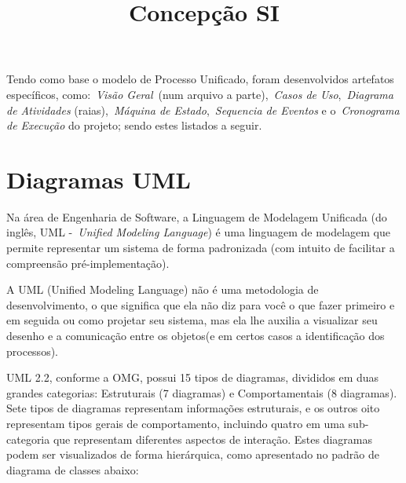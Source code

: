 \documentclass [12pt]{article}
\title {Concepção SI}
\begin{document}
	\inserirTitulo

	Tendo como base o modelo de Processo Unificado, foram desenvolvidos artefatos específicos, como:~\emph{Visão	Geral}~(num arquivo a parte),~\emph{Casos	de	Uso},~\emph{Diagrama	de	Atividades}	(raias),~\emph{Máquina	de	Estado},~\emph{Sequencia	de	Eventos} e	o~\emph{Cronograma	de	Execução}	do	projeto; sendo estes listados a seguir.
	
	\section{Diagramas UML}
	Na área de Engenharia de Software, a Linguagem de Modelagem Unificada (do inglês, UML -~\emph{Unified Modeling Language}) é uma linguagem de modelagem que permite representar um sistema de forma padronizada (com intuito de facilitar a compreensão pré-implementação).

	A UML (Unified Modeling Language) não é uma metodologia de desenvolvimento, o que significa que ela não diz para você o que fazer primeiro e em seguida ou como projetar seu sistema, mas ela lhe auxilia a visualizar seu desenho e a comunicação entre os objetos(e em certos casos a identificação dos processos).
	
	UML 2.2, conforme a OMG, possui 15 tipos de diagramas, divididos em duas grandes categorias: Estruturais (7 diagramas) e Comportamentais (8 diagramas). Sete tipos de diagramas representam informações estruturais, e os outros oito representam tipos gerais de comportamento, incluindo quatro em uma sub-categoria que representam diferentes aspectos de interação. Estes diagramas podem ser visualizados de forma hierárquica, como apresentado no padrão de diagrama de classes abaixo:
	
\end{document}
